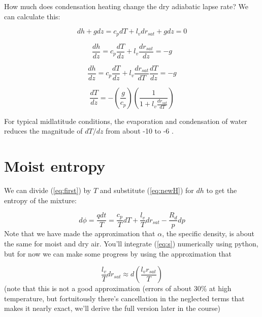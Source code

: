\documentclass[12pt]{article}
\begin{document}
How much does condensation heating change the dry adiabatic lapse rate?
We can calculate this:

\begin{equation}
  \label{eq:newHsatKR4}
  dh + g dz  = c_p dT + l_v d r_{sat} + g dz = 0
\end{equation}

\begin{equation}
  \label{eq:newHsatKR5}
  \frac{dh}{dz}= c_p \frac{dT}{dz} + l_v \frac{d r_{sat}}{dz} =  -g
\end{equation}

\begin{equation}
  \label{eq:newHsatKR6}
  \frac{dh}{dz}= c_p \frac{dT}{dz} + l_v \frac{d r_{sat}}{dT} \frac{dT}{dz} =  -g
\end{equation}


\begin{equation}
  \label{eq:newHsatKR6b}
 \frac{dT}{dz} = - \left ( \frac{g}{c_p}  \right ) \left ( \frac{1}{1 + l_v \frac{d r_{sat}}{dT}} 
\right ) 
\end{equation}

For typical midlatitude conditions, the evaporation and condensation of water reduces the
magnitude of $dT/dz$ from about -10  to -6 .

\section{Moist entropy}
\label{sec:moist-entropy}


We can divide (\ref{eq:first}) by $T$ and
substitute (\ref{eq:newH}) for $dh$ to get
the entropy of the mixture:

\begin{equation}
  \label{eq:s}
d\phi = \frac{q dt}{T} = \frac{c_p}{T} dT + \frac{l_v}{T} d r_{sat} - 
\frac{R_d}{p} dp
\end{equation}
Note that we have made the approximation that $\alpha$, the specific density,
is about the same for moist and dry air.  You'll integrate (\ref{eq:s})
numerically using python, but for now we can make some progress by
using the approximation that

\begin{equation}
  \label{eq:lvapprx}
  \frac{l_v}{T} d r_{sat} \approx d \left ( \frac{l_v r_{sat}}{ T} \right )
\end{equation}
(note that this is not a good approximation (errors of about 30\% at high temperature,
but fortuitously there's cancellation in the neglected terms that makes it nearly exact, we'll
derive the full version later in the course)
\end{document}
